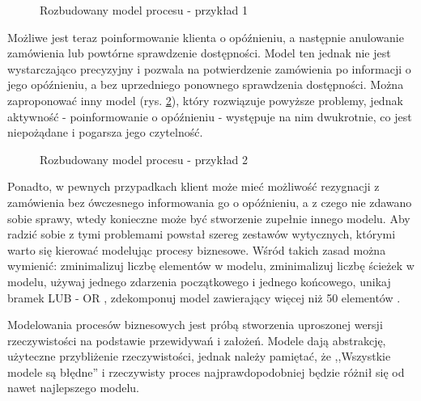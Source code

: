 \begin{figure}[h]
	\caption{\label{fig:complicated_business_process_1}Rozbudowany model procesu - przykład 1}
\end{figure}

Możliwe jest teraz poinformowanie klienta o opóźnieniu, a następnie anulowanie zamówienia lub powtórne sprawdzenie dostępności. Model ten jednak nie jest wystarczająco precyzyjny i pozwala na potwierdzenie zamówienia po informacji o jego opóźnieniu, a bez uprzedniego ponownego sprawdzenia dostępności. Można zaproponować inny model (rys. \ref{fig:complicated_business_process_2}), który rozwiązuje powyższe problemy, jednak aktywność - poinformowanie o opóźnieniu - występuje na nim dwukrotnie, co jest niepożądane i  pogarsza jego czytelność.

\begin{figure}[h]
	\caption{\label{fig:complicated_business_process_2}Rozbudowany model procesu - przykład 2}
\end{figure}

Ponadto, w pewnych przypadkach klient może mieć możliwość rezygnacji z zamówienia bez ówczesnego informowania go o opóźnieniu, a z czego nie zdawano sobie sprawy, wtedy konieczne może być stworzenie zupełnie innego modelu. Aby radzić sobie z tymi problemami powstał szereg zestawów wytycznych, którymi warto się kierować modelując procesy biznesowe. Wśród takich zasad można wymienić: zminimalizuj liczbę elementów w modelu, zminimalizuj liczbę ścieżek w modelu, używaj jednego zdarzenia początkowego i jednego końcowego, unikaj bramek LUB - OR , zdekomponuj model zawierający więcej niż 50 elementów \cite{7PMG}.

Modelowania procesów biznesowych jest próbą stworzenia uproszonej wersji rzeczywistości na podstawie przewidywań i założeń. Modele dają abstrakcję, użyteczne przybliżenie rzeczywistości, jednak należy pamiętać, że ,,Wszystkie modele są błędne'' i rzeczywisty proces najprawdopodobniej będzie różnił się od nawet najlepszego modelu. 


